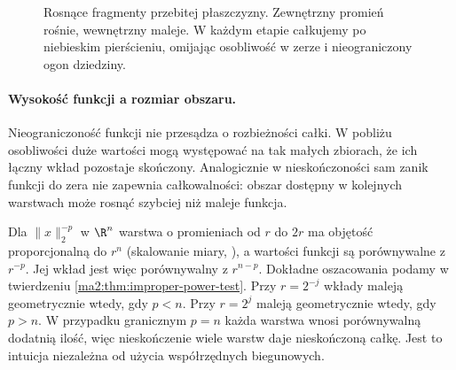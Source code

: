 \begin{figure}[htbp]
\centering
{}
\caption{Rosnące fragmenty przebitej płaszczyzny.
Zewnętrzny promień rośnie, wewnętrzny maleje.
W każdym etapie całkujemy po niebieskim
pierścieniu, omijając osobliwość w zerze
i nieograniczony ogon dziedziny.}
\label{ma2:fig:improper-exhaustion-intuition}
\end{figure}

\paragraph{Wysokość funkcji a rozmiar obszaru.}
Nieograniczoność funkcji nie przesądza o
rozbieżności całki. W pobliżu osobliwości
duże wartości mogą występować na tak
małych zbiorach, że ich łączny wkład
pozostaje skończony. Analogicznie
w nieskończoności sam zanik funkcji do
zera nie zapewnia całkowalności: obszar
dostępny w kolejnych warstwach może
rosnąć szybciej niż maleje funkcja.

Dla $\|x\|_2^{-p}$ w $\R^n$ warstwa
o promieniach od $r$ do $2r$ ma objętość
proporcjonalną do $r^n$ (skalowanie miary,
), a wartości
funkcji są porównywalne z $r^{-p}$.
Jej wkład jest więc porównywalny
z $r^{n-p}$. Dokładne oszacowania
podamy w twierdzeniu
\ref{ma2:thm:improper-power-test}.
Przy $r=2^{-j}$ wkłady maleją geometrycznie
wtedy, gdy $p<n$. Przy $r=2^j$ maleją
geometrycznie wtedy, gdy $p>n$.
W przypadku granicznym $p=n$ każda
warstwa wnosi porównywalną dodatnią
ilość, więc nieskończenie wiele warstw
daje nieskończoną całkę.
Jest to intuicja niezależna od użycia
współrzędnych biegunowych.

